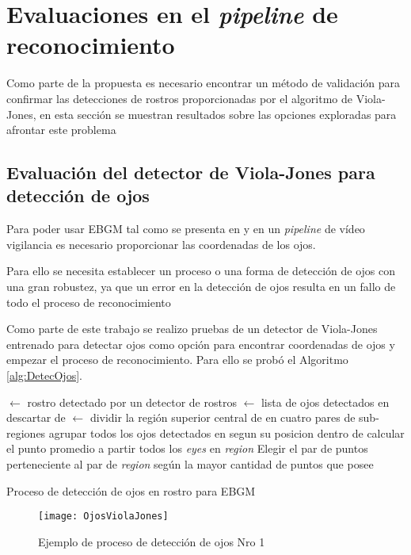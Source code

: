 \section{Evaluaciones en el \textit{pipeline} de reconocimiento}
Como parte de la propuesta es necesario encontrar un método de validación para confirmar las detecciones de rostros proporcionadas por el algoritmo de Viola-Jones, en esta sección se muestran resultados sobre las opciones exploradas para afrontar este problema

\subsection{Evaluación del detector de Viola-Jones para detección de ojos}\label{sscc:DectOjos}
Para poder usar \ac{EBGM} tal como se presenta en \cite{bolme2003elastic} y \cite{wiskott1997face} en un \textit{pipeline} de vídeo vigilancia es necesario proporcionar las coordenadas de los ojos.

Para ello se necesita establecer un proceso o una forma de detección de ojos con una gran robustez, ya que un error en la detección de ojos resulta en un fallo de todo el proceso de reconocimiento

Como parte de este trabajo se realizo pruebas de un detector de Viola-Jones entrenado para detectar ojos como opción para encontrar coordenadas de ojos y empezar el proceso de reconocimiento. Para ello se probó el Algoritmo \ref{alg:DetecOjos}.

\begin{algorithm}
\label{alg:DetecOjos}
 $\gets$ rostro detectado por un detector de rostros\;
 $\gets$ lista de ojos detectados en \;
{
    {
    	descartar  de \;
    }
}
 $\gets$ dividir la región superior central de  en cuatro pares de sub-regiones \;
agrupar todos los ojos detectados en  segun su posicion dentro de \;
{
	calcular el punto promedio a partir todos los \textit{eyes} en  \textit{region}\;
}
Elegir el par de puntos perteneciente al par de \textit{region} según la mayor cantidad de puntos que posee\;
\caption{Proceso de detección de ojos en rostro para \ac{EBGM}}
\end{algorithm}

\begin{figure}[h]
	\centering
	\texttt{[image: OjosViolaJones]}
    \caption{Ejemplo de proceso de detección de ojos Nro 1}
    \label{im:HaarOjos1}
\end{figure}

